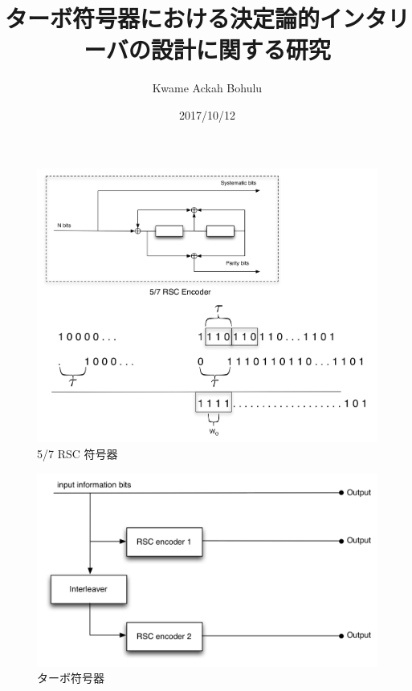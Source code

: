 \documentclass[20 pts]{article}
\title{ターボ符号器における決定論的インタリーバの設計に関する研究}
\author{Kwame Ackah Bohulu}
\date{2017/10/12}
\begin{document}
\maketitle

\newpage
\begin{center}
\begin{figure}
		\includegraphics[width=\textwidth]{RSCExample2.jpg}
		\caption{5/7 RSC 符号器}
		\end{figure}
	\end{center}

\begin{center}
\begin{figure}
		\includegraphics[width=\textwidth]{TurboEncoderNew.jpg}
		\caption{ターボ符号器}
		\end{figure}
	\end{center}
	
\end{document}
